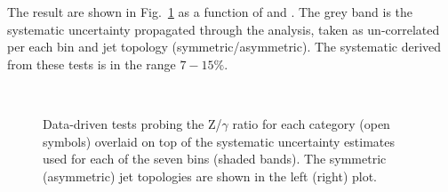 The result are shown in Fig.~\ref{fig:closurePhoToMuMu} as a function of \scalht and \njet. 
The grey band is the systematic uncertainty propagated through the analysis, 
taken as un-correlated per each \scalht bin and jet topology (symmetric/asymmetric). The systematic derived from these tests is
in the range $7-15\%$.


\begin{figure}[h!]
  \begin{center}
    ~~
    \caption{Data-driven tests probing the Z/$\gamma$ ratio for each
      \njet category (open symbols) overlaid on top of the systematic
      uncertainty estimates used for each of the seven \scalht bins
      (shaded bands). 
      The symmetric (asymmetric) jet topologies are shown in the left (right) plot.      
    }
    \label{fig:closurePhoToMuMu}
  \end{center} 
\end{figure}





